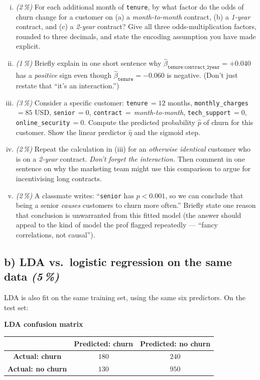 \documentclass[11pt,a4paper]{article}
\newcommand{\subpoints}[1]{\textit{(#1\,\%)}}
\begin{document}
\begin{enumerate}[(i)]
  \item \subpoints{2} For each additional month of \texttt{tenure}, by what factor do the odds of churn change for a customer on (a) a \emph{month-to-month} contract, (b) a \emph{1-year} contract, and (c) a \emph{2-year} contract? Give all three odds-multiplication factors, rounded to three decimals, and state the encoding assumption you have made explicit.

  \item \subpoints{1} Briefly explain in one short sentence why $\hat\beta_{\texttt{tenure:contract\_2year}} = +0.040$ has a \emph{positive} sign even though $\hat\beta_{\texttt{tenure}} = -0.060$ is negative. (Don't just restate that ``it's an interaction.'')

  \item \subpoints{3} Consider a specific customer: \texttt{tenure}\,$=12$ months, \texttt{monthly\_charges}\,$=85$ USD, \texttt{senior}\,$=0$, \texttt{contract}\,$=$\,\emph{month-to-month}, \texttt{tech\_support}\,$=0$, \texttt{online\_security}\,$=0$. Compute the predicted probability $\hat p$ of churn for this customer. Show the linear predictor $\hat\eta$ and the sigmoid step.

  \item \subpoints{2} Repeat the calculation in (iii) for an \emph{otherwise identical} customer who is on a \emph{2-year} contract. \emph{Don't forget the interaction.} Then comment in one sentence on why the marketing team might use this comparison to argue for incentivising long contracts.

  \item \subpoints{2} A classmate writes: ``\texttt{senior} has $p < 0.001$, so we can conclude that being a senior \emph{causes} customers to churn more often.'' Briefly state one reason that conclusion is unwarranted from this fitted model (the answer should appeal to the kind of model the prof flagged repeatedly --- ``fancy correlations, not causal'').
\end{enumerate}

\subsection*{b) LDA vs.\ logistic regression on the same data \subpoints{5}}

LDA is also fit on the same training set, using the same six predictors. On the test set:

\begin{center}\small
\textbf{LDA confusion matrix} \\[0.3em]
\begin{tabular}{c|cc}
 & \textbf{Predicted: churn} & \textbf{Predicted: no churn} \\ \hline
\textbf{Actual: churn}    & $180$ & $240$ \\
\textbf{Actual: no churn} & $130$ & $950$ \\
\end{tabular}
\end{center}
\end{document}
